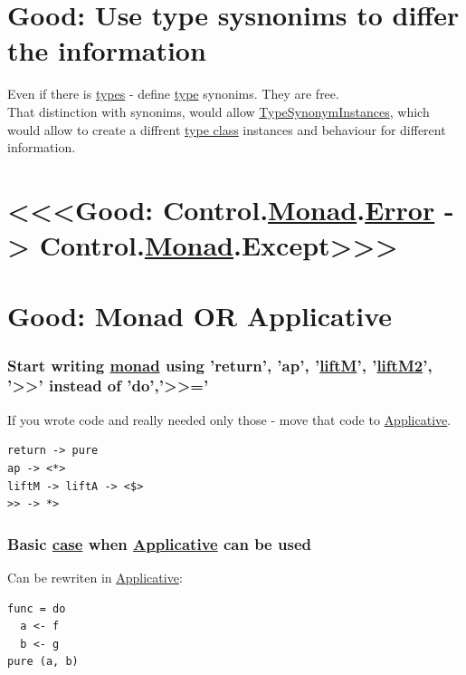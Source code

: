 \documentclass[a4paper,14pt,oneside]{book}
\begin{document}
{\chapter{\label{orgc54518a}Good: Use type sysnonims to differ the information}
\label{sec:orgb553ae4}
Even if there is \hyperref[org51532d9]{types} - define \hyperref[orga9ca243]{type} synonims. They are free.\\
That distinction with synonims, would allow \hyperref[org74ec05f]{TypeSynonymInstances}, which would allow to create a diffrent \hyperref[org6c8048d]{type class} instances and behaviour for different information.\\

\chapter{<<<Good: Control.\hyperref[org90c21ab]{Monad}.\hyperref[orgb40c72e]{Error} -> Control.\hyperref[org90c21ab]{Monad}.Except>>>}
\label{sec:org07d7fab}

\chapter{\label{orge5b2ceb}Good: Monad OR Applicative}
\label{sec:org88b4f0b}

\subsection{Start writing \hyperref[org90c21ab]{monad} using 'return', 'ap', '\hyperref[orgc693f89]{liftM}', '\hyperref[org5a1a1cb]{liftM2}', '>>' instead of 'do','>>='}
\label{sec:orge922388}

If you wrote code and really needed only those - move that code to \hyperref[org812e4b8]{Applicative}.\\
\begin{verbatim}
return -> pure
ap -> <*>
liftM -> liftA -> <$>
>> -> *>
\end{verbatim}

\subsection{Basic \hyperref[org6609611]{case} when \hyperref[org812e4b8]{Applicative} can be used}
\label{sec:org9b68c26}

Can be rewriten in \hyperref[org812e4b8]{Applicative}:\\
\begin{verbatim}
func = do
  a <- f
  b <- g
pure (a, b)
\end{verbatim}

}
\end{document}
